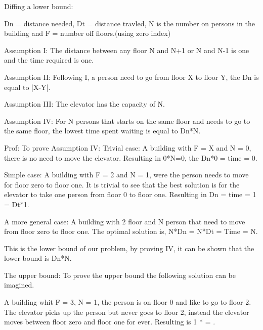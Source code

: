 Diffing a lower bound:

Dn = distance needed, Dt = distance travled, N is the number on persons in the building and F = number off floors.(using zero index)

Assumption I: The distance between any floor N and N+1 or N and N-1 is one and the time required is one. 

Assumption II: Following I, a person need to go from floor X to floor Y, the Dn is equal to |X-Y|.

Assumption III: The elevator has the capacity of N. 

Assumption IV: For N persons that starts on the same floor and needs to go to the same floor, the lowest time spent waiting is equal to Dn*N.

Prof: 
To prove Assumption IV: 
Trivial case: A building with F = X and N = 0, there is no need to move the elevator. Resulting in 0*N=0, the Dn*0 = time = 0.

Simple case: A building with F = 2 and N = 1, were the person needs to move for floor zero to floor one. It is trivial to see that the best solution is for the elevator to take one person from floor 0 to floor one. Resulting in Dn = time = 1 = Dt*1. 

A more general case: 
A building with 2 floor and N person that need to move from floor zero to floor one. The optimal solution is, N*Dn = N*Dt = Time = N.

This is the lower bound of our problem, by proving IV, it can be shown that the lower bound is Dn*N. 

The upper bound:
To prove the upper bound the following solution can be imagined.   

A building whit F = 3, N = 1, the person is on floor 0 and like to go to floor 2. The elevator picks up the person but never goes to floor 2, instead the elevator moves between floor zero and floor one for ever. Resulting is  1 * \infty  =   \infty. 
